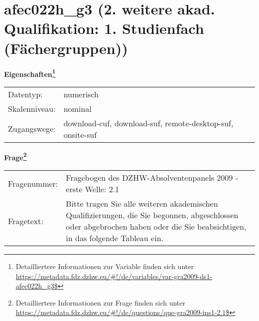 
    \setcounter{footnote}{0}

    \vspace*{-1.8cm}
	\section{afec022h\_g3 (2. weitere akad. Qualifikation: 1. Studienfach (Fächergruppen))}
	\label{section:afec022h_g3}



    \vspace*{0.5cm}
    \noindent\textbf{Eigenschaften\footnote{Detailliertere Informationen zur Variable finden sich unter
		\url{https://metadata.fdz.dzhw.eu/\#!/de/variables/var-gra2009-ds1-afec022h_g3$}}}\\
	\begin{tabularx}{\hsize}{@{}lX}
	Datentyp: & numerisch \\
	Skalenniveau: & nominal \\
	Zugangswege: &
	  download-cuf, 
	  download-suf, 
	  remote-desktop-suf, 
	  onsite-suf
 \\
    \end{tabularx}



				\vspace*{0.5cm}
                \noindent\textbf{Frage\footnote{Detailliertere Informationen zur Frage finden sich unter
		              \url{https://metadata.fdz.dzhw.eu/\#!/de/questions/que-gra2009-ins1-2.1$}}}\\
				\begin{tabularx}{\hsize}{@{}lX}
					Fragenummer: &
					  Fragebogen des DZHW-Absolventenpanels 2009 - erste Welle:
					  2.1
 \\
					Fragetext: & Bitte tragen Sie alle weiteren akademischen Qualifizierungen, die Sie begonnen, abgeschlossen oder abgebrochen haben oder die Sie beabsichtigen, in das folgende Tableau ein. \\
				\end{tabularx}





